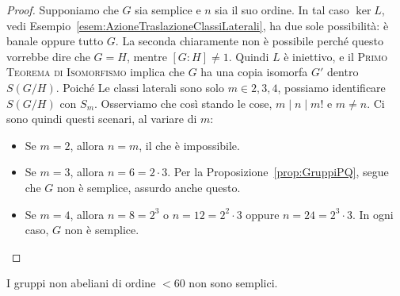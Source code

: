 \begin{proof}
Supponiamo che $G$ sia semplice e $n$ sia il suo ordine. In tal caso $\ker L$, vedi Esempio~\ref{esem:AzioneTraslazioneClassiLaterali}, ha due sole possibilità: è banale oppure tutto $G$. La seconda chiaramente non è possibile perché questo vorrebbe dire che $G=H$, mentre $[G:H] \ne 1$. Quindi $L$ è iniettivo, e il {\scshape Primo Teorema di Isomorfismo} implica che $G$ ha una copia isomorfa $G'$ dentro $S(G/H)$. Poiché Le classi laterali sono solo $m \in {2, 3, 4}$, possiamo identificare $S(G/H)$ con $S_m$. Osserviamo che così stando le cose, $m \mid n \mid m!$ e $m \ne n$. Ci sono quindi questi scenari, al variare di $m$:
\begin{itemize}
\item Se $m=2$, allora $n = m$, il che è impossibile.
\item Se $m=3$, allora $n = 6 = 2 \cdot 3$. Per la Proposizione~\ref{prop:GruppiPQ}, segue che $G$ non è semplice, assurdo anche questo.
\item Se $m=4$, allora $n = 8 = 2^3$ o $n = 12 =2^2 \cdot 3$ oppure $n = 24 = 2^3 \cdot 3$. %
In ogni caso, $G$ non è semplice.\qedhere
\end{itemize}
\end{proof}




\begin{prop}
I gruppi non abeliani di ordine $< 60$ non sono semplici.
\end{prop}

